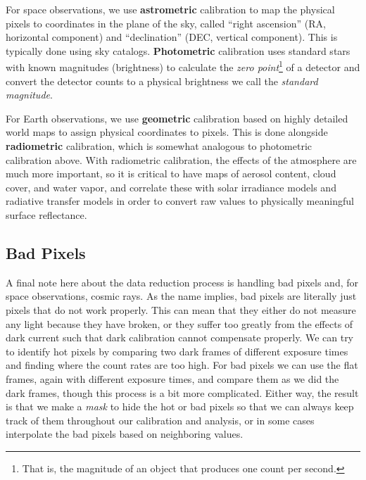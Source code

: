 \documentclass{tufte-book}
\begin{document}
For space observations, we use \textbf{astrometric} calibration to map the physical pixels to coordinates in the plane of the sky, called ``right ascension'' (RA, horizontal component) and ``declination'' (DEC, vertical component). This is typically done using sky catalogs. \textbf{Photometric} calibration uses standard stars with known magnitudes (brightness) to calculate the \textit{zero point}\footnote{That is, the magnitude of an object that produces one count per second.} of a detector and convert the detector counts to a physical brightness we call the \textit{standard magnitude}.

For Earth observations, we use \textbf{geometric} calibration based on highly
detailed world maps to assign physical coordinates to pixels. This
is done alongside \textbf{radiometric} calibration, which is somewhat analogous
to photometric calibration above. With radiometric calibration, the effects of
the atmosphere are much more important, so it is critical to have maps of
aerosol content, cloud cover, and water vapor, and correlate these with solar
irradiance models and radiative transfer models in order to convert raw values
to physically meaningful surface reflectance.

\subsection{Bad Pixels}

A final note here about the data reduction process is handling bad pixels and, for space observations, cosmic rays. As the name implies, bad pixels are literally just pixels that do not work properly. This can mean that they either do not measure any light because they have broken, or they suffer too greatly from the effects of dark current such that dark calibration cannot compensate properly. We can try to identify hot pixels by comparing two dark frames of different exposure times and finding where the count rates are too high. For bad pixels we can use the flat frames, again with different exposure times, and compare them as we did the dark frames, though this process is a bit more complicated. Either way, the result is that we make a \textit{mask} to hide the hot or bad pixels so that we can always keep track of them throughout our calibration and analysis, or in some cases interpolate the bad pixels based on neighboring values.
\end{document}

